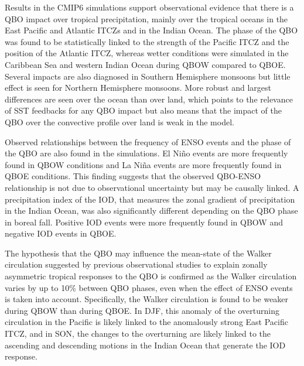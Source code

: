 Results in the CMIP6 simulations support observational evidence \citep{collimore2003,liess2012,gray2018}  that there is a QBO impact over tropical precipitation, mainly over the tropical oceans in the East Pacific and Atlantic ITCZs and in the Indian Ocean.
The phase of the QBO was found to be statistically linked to the strength of the Pacific ITCZ and the position of the Atlantic ITCZ, whereas wetter conditions were simulated in the Caribbean Sea and western Indian Ocean during QBOW compared to QBOE. Several impacts are also diagnosed in Southern Hemisphere monsoons but little effect is seen for Northern Hemisphere monsoons.
 More robust and largest differences are seen over the ocean than over land, which points to the relevance of SST feedbacks for any QBO impact but also means that the impact of the QBO over the convective profile over land is weak in the model. 
 
 Observed relationships between the frequency of ENSO events and the phase of the QBO are also found in the simulations. El Niño events are more frequently found in QBOW conditions and La Niña events are more frequently found in QBOE conditions. This finding suggests that the observed QBO-ENSO relationship is not due to observational uncertainty but may be causally linked. 
A precipitation index of the IOD, that measures the zonal gradient of precipitation in the Indian Ocean, was also significantly different depending on the QBO phase in boreal fall. Positive IOD events were more frequently found in QBOW and negative IOD events in QBOE.




 The hypothesis that the QBO may influence the mean-state of the Walker circulation suggested by previous observational studies to explain zonally asymmetric tropical responses to the QBO \citep[e.g.][]{collimore2003,liess2012} is confirmed as the Walker circulation varies by up to 10\% between QBO phases, even when the effect of ENSO events is taken into account. 
 Specifically, the Walker circulation is found to be weaker during QBOW than during QBOE. In DJF, this anomaly of the overturning circulation in the Pacific is likely linked to the anomalously strong East Pacific ITCZ, and in SON, the changes to the overturning are likely linked to the ascending and descending motions in the Indian Ocean that generate the IOD response.
 
 
